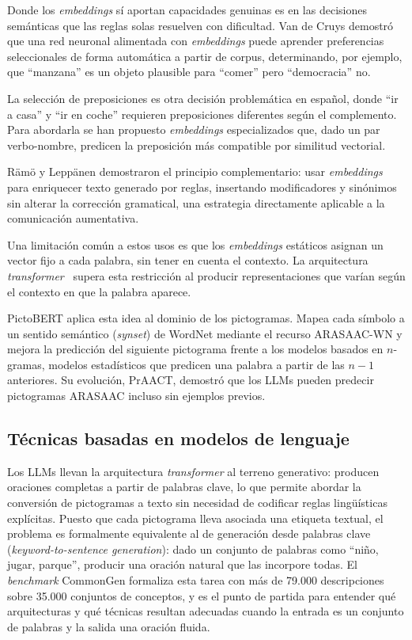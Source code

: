 Donde los \textit{embeddings} sí aportan capacidades genuinas es en las decisiones semánticas que las reglas solas resuelven con dificultad. Van de Cruys demostró que una red neuronal alimentada con \textit{embeddings} puede aprender preferencias seleccionales de forma automática a partir de corpus, determinando, por ejemplo, que ``manzana'' es un objeto plausible para ``comer'' pero ``democracia'' no.

La selección de preposiciones es otra decisión problemática en español, donde ``ir a casa'' y ``ir en coche'' requieren preposiciones diferentes según el complemento. Para abordarla se han propuesto \textit{embeddings} especializados que, dado un par verbo-nombre, predicen la preposición más compatible por similitud vectorial.

Rämö y Leppänen demostraron el principio complementario: usar \textit{embeddings} para enriquecer texto generado por reglas, insertando modificadores y sinónimos sin alterar la corrección gramatical, una estrategia directamente aplicable a la comunicación aumentativa.

Una limitación común a estos usos es que los \textit{embeddings} estáticos asignan un vector fijo a cada palabra, sin tener en cuenta el contexto. La arquitectura \textit{transformer}~\cite{devlin2019bert} supera esta restricción al producir representaciones que varían según el contexto en que la palabra aparece.

PictoBERT aplica esta idea al dominio de los pictogramas. Mapea cada símbolo a un sentido semántico (\textit{synset}) de WordNet mediante el recurso ARASAAC-WN y mejora la predicción del siguiente pictograma frente a los modelos basados en $n$-gramas, modelos estadísticos que predicen una palabra a partir de las $n-1$ anteriores. Su evolución, PrAACT, demostró que los LLMs pueden predecir pictogramas ARASAAC incluso sin ejemplos previos.

\subsection{Técnicas basadas en modelos de lenguaje}

Los LLMs llevan la arquitectura \textit{transformer} al terreno generativo: producen oraciones completas a partir de palabras clave, lo que permite abordar la conversión de pictogramas a texto sin necesidad de codificar reglas lingüísticas explícitas. Puesto que cada pictograma lleva asociada una etiqueta textual, el problema es formalmente equivalente al de generación desde palabras clave (\textit{keyword-to-sentence generation}): dado un conjunto de palabras como ``niño, jugar, parque'', producir una oración natural que las incorpore todas. El \textit{benchmark} CommonGen formaliza esta tarea con más de 79.000 descripciones sobre 35.000 conjuntos de conceptos, y es el punto de partida para entender qué arquitecturas y qué técnicas resultan adecuadas cuando la entrada es un conjunto de palabras y la salida una oración fluida.

